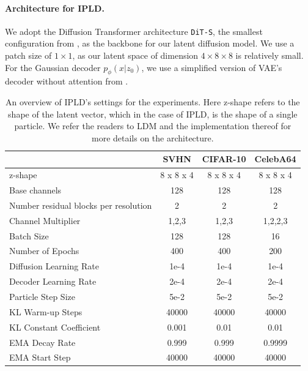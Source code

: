 \paragraph{Architecture for \gls*{IPLD}.} We adopt the Diffusion Transformer architecture \texttt{DiT-S}, the smallest configuration from \citet{peebles2023scalablediffusionmodelstransformers}, as the backbone for our latent diffusion model. We use a patch size of $1\times 1$, as our latent space of dimension $4\times 8\times 8$ is relatively small. For the Gaussian decoder $p_\phi( x|z_0)$, we use a simplified version of \gls*{VAE}'s decoder without attention from \citet{rombachhighresolutionimagesynthesis2022}.
\begin{table}[htp]
    \centering
    \begin{tabular}{lccc}
\hline
                                         & SVHN           & CIFAR-10      & CelebA64    \\ \hline
z-shape                                  & 8 x 8 x 4      & 8 x 8 x 4     & 8 x 8 x 4   \\
Base channels                            & 128            & 128           & 128         \\
Number residual blocks per resolution    & 2              & 2             & 2           \\
Channel Multiplier                       & 1,2,3          & 1,2,3         & 1,2,2,3     \\
Batch Size                               & 128            & 128           & 16          \\
Number of Epochs                         & 400            & 400           & 200         \\
Diffusion Learning Rate                  & 1e-4           & 1e-4          & 1e-4        \\ 
Decoder Learning Rate                    & 2e-4           & 2e-4          & 2e-4        \\ 
Particle Step Size                       & 5e-2           & 5e-2          & 5e-2        \\ 
KL Warm-up Steps                         & 40000          & 40000         & 40000       \\
KL Constant Coefficient                         & 0.001          & 0.01        & 0.01       \\
EMA Decay Rate                           & 0.999          & 0.999         & 0.9999       \\
EMA Start Step                           & 40000          & 40000         & 40000       \\ 
\hline
\end{tabular}
    \vspace{0.2cm}
    \caption{An overview of \gls*{IPLD}'s settings for the experiments. Here z-shape refers to the shape of the latent vector, which in the case of \gls*{IPLD}, is the shape of a single particle. We refer the readers to \gls*{LDM} \citep{rombachhighresolutionimagesynthesis2022} and the implementation thereof for more details on the architecture.}
    \label{tab:app_arch}
\end{table}
